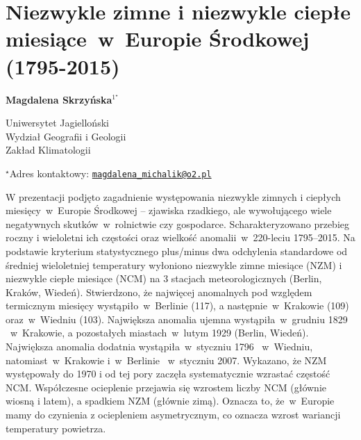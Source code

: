 \documentclass[\main/boa.tex]{subfiles}
\begin{document}
\sloppy


\section{Niezwykle zimne i niezwykle ciepłe miesiące~w~Europie Środkowej \mbox{(1795-2015)}}

\begin{center}
  {\bf {} Magdalena Skrzyńska$^{1^\star}$}
\end{center}

\vskip 0.3cm

\begin{affiliations}
\begin{enumerate}
\begin{minipage}{0.915\textwidth}
\centering
\item Uniwersytet Jagielloński\\ Wydział Geografii i Geologii\\ Zakład Klimatologii\\[-2pt]
\end{minipage}
\end{enumerate}
$^\star$Adres kontaktowy: \href{mailto:magdalena_michalik@o2.pl}{\nolinkurl{magdalena_michalik@o2.pl}}\\
\end{affiliations}

\vskip 0.5cm


\vskip 0.5cm

W prezentacji podjęto zagadnienie występowania niezwykle zimnych i ciepłych miesięcy~w~Europie Środkowej -- zjawiska rzadkiego, ale wywołującego wiele negatywnych skutków~w~rolnictwie czy gospodarce. Scharakteryzowano przebieg roczny i wieloletni ich częstości oraz wielkość anomalii~w~220-leciu \mbox{1795--2015}.  Na podstawie kryterium statystycznego plus/minus dwa odchylenia standardowe od średniej wieloletniej temperatury wyłoniono niezwykle zimne miesiące (NZM) i niezwykle ciepłe miesiące (NCM) na 3 stacjach meteorologicznych (Berlin, Kraków, Wiedeń). Stwierdzono, że najwięcej anomalnych pod względem termicznym miesięcy wystąpiło~w~Berlinie (117), a następnie~w~Krakowie (109) oraz~w~Wiedniu (103).  Największa anomalia ujemna wystąpiła~w~grudniu 1829 ~w~Krakowie, a pozostałych miastach~w~lutym 1929 (Berlin, Wiedeń). Największa anomalia dodatnia wystąpiła~w~styczniu 1796 ~w~Wiedniu, natomiast~w~Krakowie i~w~Berlinie ~w~styczniu 2007. Wykazano, że NZM występowały do 1970 i od tej pory zaczęła systematycznie wzrastać częstość NCM. Współczesne ocieplenie przejawia się wzrostem liczby NCM (głównie wiosną i latem), a spadkiem NZM (głównie zimą). Oznacza to, że~w~Europie mamy do czynienia z ociepleniem asymetrycznym, co oznacza wzrost wariancji temperatury powietrza. 
\end{document}
